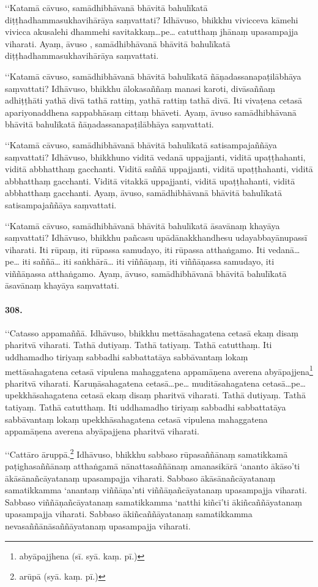 ‘‘Katamā cāvuso, samādhibhāvanā bhāvitā bahulīkatā diṭṭhadhammasukhavihārāya saṃvattati? Idhāvuso, bhikkhu vivicceva kāmehi vivicca akusalehi dhammehi savitakkaṃ…pe… catutthaṃ jhānaṃ upasampajja viharati. Ayaṃ, āvuso , samādhibhāvanā bhāvitā bahulīkatā diṭṭhadhammasukhavihārāya saṃvattati.

‘‘Katamā cāvuso, samādhibhāvanā bhāvitā bahulīkatā ñāṇadassanapaṭilābhāya saṃvattati? Idhāvuso, bhikkhu ālokasaññaṃ manasi karoti, divāsaññaṃ adhiṭṭhāti yathā divā tathā rattiṃ, yathā rattiṃ tathā divā. Iti vivaṭena cetasā apariyonaddhena sappabhāsaṃ cittaṃ bhāveti. Ayaṃ, āvuso samādhibhāvanā bhāvitā bahulīkatā ñāṇadassanapaṭilābhāya saṃvattati.

‘‘Katamā cāvuso, samādhibhāvanā bhāvitā bahulīkatā satisampajaññāya saṃvattati? Idhāvuso, bhikkhuno viditā vedanā uppajjanti, viditā upaṭṭhahanti, viditā abbhatthaṃ gacchanti. Viditā saññā uppajjanti, viditā upaṭṭhahanti, viditā abbhatthaṃ gacchanti. Viditā vitakkā uppajjanti, viditā upaṭṭhahanti, viditā abbhatthaṃ gacchanti. Ayaṃ, āvuso, samādhibhāvanā bhāvitā bahulīkatā satisampajaññāya saṃvattati.

‘‘Katamā cāvuso, samādhibhāvanā bhāvitā bahulīkatā āsavānaṃ khayāya saṃvattati? Idhāvuso, bhikkhu pañcasu upādānakkhandhesu udayabbayānupassī viharati. Iti rūpaṃ, iti rūpassa samudayo, iti rūpassa atthaṅgamo. Iti vedanā…pe… iti saññā… iti saṅkhārā… iti viññāṇaṃ, iti viññāṇassa samudayo, iti viññāṇassa atthaṅgamo. Ayaṃ, āvuso, samādhibhāvanā bhāvitā bahulīkatā āsavānaṃ khayāya saṃvattati.

\paragraph{308.} ‘‘Catasso appamaññā. Idhāvuso, bhikkhu mettāsahagatena cetasā ekaṃ disaṃ pharitvā viharati. Tathā dutiyaṃ. Tathā tatiyaṃ. Tathā catutthaṃ. Iti uddhamadho tiriyaṃ sabbadhi sabbattatāya sabbāvantaṃ lokaṃ mettāsahagatena cetasā vipulena mahaggatena appamāṇena averena abyāpajjena\footnote{abyāpajjhena (sī. syā. kaṃ. pī.)} pharitvā viharati. Karuṇāsahagatena cetasā…pe… muditāsahagatena cetasā…pe… upekkhāsahagatena cetasā ekaṃ disaṃ pharitvā viharati. Tathā dutiyaṃ. Tathā tatiyaṃ. Tathā catutthaṃ. Iti uddhamadho tiriyaṃ sabbadhi sabbattatāya sabbāvantaṃ lokaṃ upekkhāsahagatena cetasā vipulena mahaggatena appamāṇena averena abyāpajjena pharitvā viharati.

‘‘Cattāro āruppā.\footnote{arūpā (syā. kaṃ. pī.)} Idhāvuso, bhikkhu sabbaso rūpasaññānaṃ samatikkamā paṭighasaññānaṃ atthaṅgamā nānattasaññānaṃ amanasikārā ‘ananto ākāso’ti ākāsānañcāyatanaṃ upasampajja viharati. Sabbaso ākāsānañcāyatanaṃ samatikkamma ‘anantaṃ viññāṇa’nti viññāṇañcāyatanaṃ upasampajja viharati. Sabbaso viññāṇañcāyatanaṃ samatikkamma ‘natthi kiñcī’ti ākiñcaññāyatanaṃ upasampajja viharati. Sabbaso ākiñcaññāyatanaṃ samatikkamma nevasaññānāsaññāyatanaṃ upasampajja viharati.

